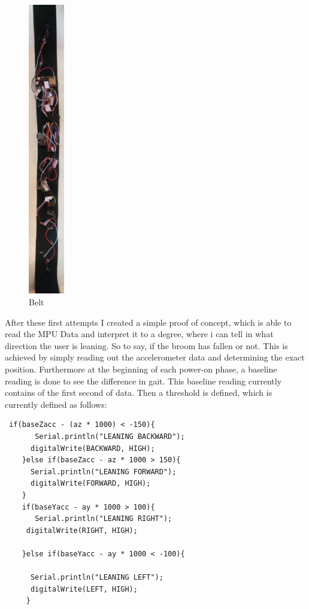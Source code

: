 \begin{figure}
\centering
\includegraphics[width=0.14\textwidth]{images/belt.jpg}
    \caption{Belt}
        \label{fig:Belt}
\end{figure}

After these first attempts I created a simple proof of concept, which is able to read the MPU Data and interpret it to a degree, where i can tell in what direction the user is leaning. So to say, if the broom has fallen or not. This is achieved by simply reading out the accelerometer data and determining the exact position. Furthermore at the beginning of each power-on phase, a baseline reading is done to see the difference in gait. This baseline reading currently contains of the first second of data. Then a threshold is defined, which is currently defined as follows:

\begin{lstlisting}
 if(baseZacc - (az * 1000) < -150){
       Serial.println("LEANING BACKWARD");
      digitalWrite(BACKWARD, HIGH);
    }else if(baseZacc - az * 1000 > 150){
      Serial.println("LEANING FORWARD");
      digitalWrite(FORWARD, HIGH);
    }
    if(baseYacc - ay * 1000 > 100){
       Serial.println("LEANING RIGHT");
     digitalWrite(RIGHT, HIGH);

    }else if(baseYacc - ay * 1000 < -100){
      
      Serial.println("LEANING LEFT");
      digitalWrite(LEFT, HIGH);
     }
\end{lstlisting}

